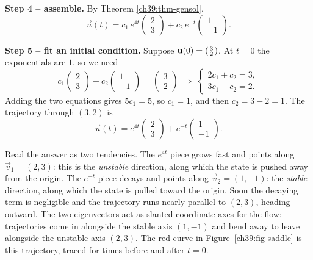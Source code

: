 \textbf{Step 4 -- assemble.} By Theorem \ref{ch39:thm-gensol},
\[
  \vec u(t)
   = c_1\,e^{4t}\begin{pmatrix} 2 \\ 3 \end{pmatrix}
   + c_2\,e^{-t}\begin{pmatrix} 1 \\ -1 \end{pmatrix}.
\]

\textbf{Step 5 -- fit an initial condition.} Suppose
$\vec u(0) = \begin{psmallmatrix} 3 \\ 2\end{psmallmatrix}$. At $t=0$ the
exponentials are $1$, so we need
\[
  c_1\begin{pmatrix} 2 \\ 3 \end{pmatrix}
  + c_2\begin{pmatrix} 1 \\ -1 \end{pmatrix}
  = \begin{pmatrix} 3 \\ 2 \end{pmatrix}
  \;\Longrightarrow\;
  \begin{cases} 2c_1 + c_2 = 3,\\ 3c_1 - c_2 = 2. \end{cases}
\]
Adding the two equations gives $5c_1 = 5$, so $c_1 = 1$, and then $c_2 = 3 - 2 = 1$.
The trajectory through $(3,2)$ is
\[
  \vec u(t) = e^{4t}\begin{pmatrix} 2 \\ 3 \end{pmatrix}
            + e^{-t}\begin{pmatrix} 1 \\ -1 \end{pmatrix}.
\]

\begin{intuitionbox}
Read the answer as two tendencies. The $e^{4t}$ piece grows
fast and points along $\vec v_1 = (2,3)$: this is the \emph{unstable}
direction, along which the state is pushed away from the origin. The $e^{-t}$ piece decays and
points along $\vec v_2 = (1,-1)$: the \emph{stable} direction, along which the
state is pulled toward the origin. Soon the decaying term is negligible and
the trajectory runs nearly parallel to $(2,3)$, heading outward. The two
eigenvectors act as slanted coordinate axes for the flow: trajectories come in
alongside the stable axis $(1,-1)$ and bend away to leave alongside the unstable
axis $(2,3)$. The red curve in Figure~\ref{ch39:fig-saddle} is this trajectory,
traced for times before and after $t=0$.
\end{intuitionbox}

